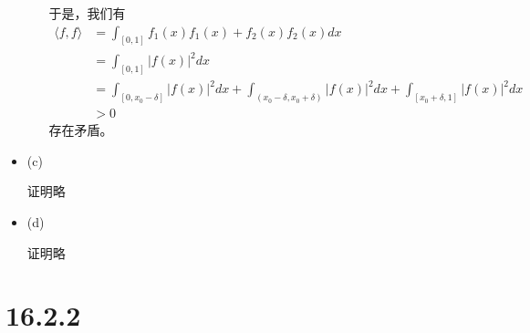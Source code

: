\documentclass{article}
\begin{document}
\begin{itemize}
\begin{itemize}
                于是，我们有
                \begin{align*}
                  \langle f, f \rangle & = \int_{[0, 1]} f_1(x)f_1(x) + f_2(x)f_2(x)dx \\
                                       & = \int_{[0, 1]} |f(x)|^2 dx                   \\
                                       & = \int_{[0, x_0 - \delta]} |f(x)|^2 dx
                  + \int_{(x_0 - \delta, x_0 + \delta)} |f(x)|^2 dx
                  + \int_{[x_0 + \delta, 1]} |f(x)|^2 dx                               \\
                                       & > 0
                \end{align*}
                存在矛盾。

        \end{itemize}

  \item (c)

        证明略

  \item (d)

        证明略
\end{itemize}

\section*{16.2.2}
\end{document}
